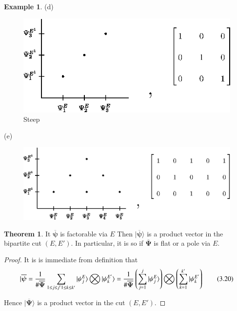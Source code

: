 \documentclass[a4paper,12pt]{article}
\theoremstyle{definition}
\theoremstyle{underlinethm}
\newtheorem{thm}{Theorem}[section]
\newtheorem{example}{Example}[section]
\theoremstyle{definition}
\begin{document}
\begin{example}
\newpage

(d)
\begin{figure}[h]
\centering
\includegraphics[scale=1.2]{figure/fig7.eps}
\caption{Steep}\label{fig07}
\end{figure}

(e)
\begin{figure}[h]
\centering
\includegraphics[scale=1]{figure/fig8.eps}
\caption{}\label{fig05}
\end{figure}

\end{example}

\begin{thm}\label{thm-3.2}
It $\overline{\boldsymbol{\psi}}$ is factorable via $E$ Then $| \overline{\boldsymbol{\psi}} \rangle$ is a product vector in the bipartite cut $(E, E')$. In particular, it is so if $\overline{\boldsymbol{\Psi}}$ is flat or a pole via $E$.
\end{thm}

\begin{proof}
It is is immediate from definition that 
\begin{equation}
| \overline{\boldsymbol{\psi}} = \frac{1}{\# \overline{\boldsymbol{\Psi}}} \sum_{\substack{1 \leq j \leq j'}\\ 1 \leq k \leq k'} | \psi^{E}_{j} \rangle \bigotimes | \psi_{k}^{E'} \rangle = \frac{1}{\# \overline{\boldsymbol{\Psi}}}\left(\sum_{j=1}^{j} | \psi_{j}^{E} \rangle\right) \bigotimes \left(\sum_{k=1}^{k'} | \psi_{k}^{E'}\right) \tag{3.20}\label{eq-3.20}
\end{equation}

Hence $| \overline{\boldsymbol{\Psi}}\rangle$ is a product vector in the cut $(E, E')$.

\end{proof}
\end{document}
